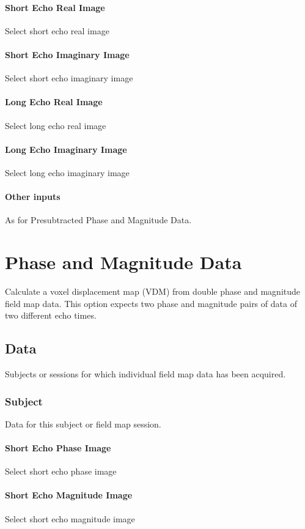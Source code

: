 \paragraph{Short Echo Real Image}
Select short echo real image


\paragraph{Short Echo Imaginary Image}
Select short echo imaginary image


\paragraph{Long Echo Real Image}
Select long echo real image


\paragraph{Long Echo Imaginary Image}
Select long echo imaginary image

\paragraph{Other inputs}
As for Presubtracted Phase and Magnitude Data.

\section{Phase and Magnitude Data}
Calculate a voxel displacement map (VDM) from double phase and magnitude field map data. This option expects two phase and magnitude pairs of data of two different echo times.


\subsection{Data}
Subjects or sessions for which individual field map data has been acquired.


\subsubsection{Subject}
Data for this subject or field map session.


\paragraph{Short Echo Phase Image}
Select short echo phase image


\paragraph{Short Echo Magnitude Image}
Select short echo magnitude image


